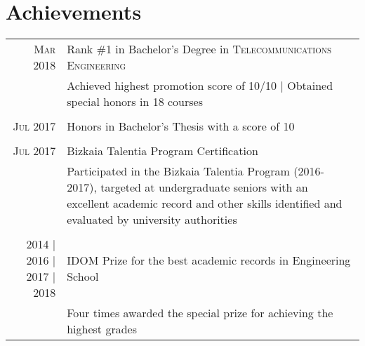 \documentclass[a4paper,10pt]{article}
\begin{document}
\section{Achievements}
\begin{tabular}{rp{13.6cm}}
\textsc{Mar} 2018 & Rank \#1 in Bachelor's Degree in \textsc{Telecommunications Engineering} \\%
&\footnotesize{Achieved highest promotion score of 10/10 | Obtained special honors in 18 courses} \\\vspace{-0.05in}&\\

\textsc{Jul} 2017 & Honors in Bachelor's Thesis with a score of 10 \\%
\vspace{-0.05in}&\\

\textsc{Jul} 2017 & Bizkaia Talentia Program Certification \\%
& \footnotesize{Participated in the Bizkaia Talentia Program (2016-2017), targeted at undergraduate seniors \newline with an excellent academic record and other skills identified and evaluated by university authorities} \\\vspace{-0.05in}&\\

2014 | 2016 | 2017 | 2018 & IDOM Prize for the best academic records in Engineering School\\%
&\footnotesize{Four times awarded the special prize for achieving the highest grades} \\
\end{tabular}
\end{document}

